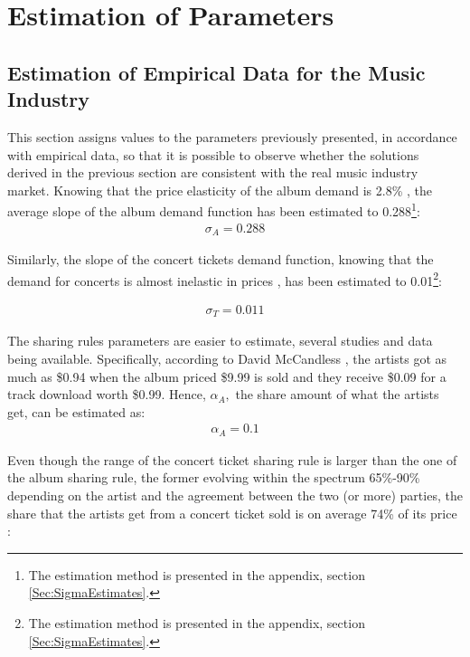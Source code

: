 \documentclass[a4paper,12pt]{article}
\numberwithin{equation}{section}
\begin{document}
\section{Estimation of Parameters} \label{Sec:Estimates}

\subsection{Estimation of Empirical Data for the Music Industry}

This section assigns values to the parameters previously presented,
in accordance with empirical data, so that it is possible to observe
whether the solutions derived in the previous section are consistent
with the real music industry market. Knowing that the price elasticity
of the album demand is 2.8\% \cite{gast2002}, the average slope of
the album demand function has been estimated to 0.288\footnote{
The estimation method is presented in the appendix, section \ref{Sec:SigmaEstimates}.
}:
\begin{eqnarray*}
\sigma_{A}=0.288
\end{eqnarray*}

Similarly, the slope of the concert tickets demand function, knowing
that the demand for concerts is almost inelastic in prices \cite{courty2009}, has been estimated to 0.01\footnote{
The estimation method is presented in the appendix, section \ref{Sec:SigmaEstimates}.
}:

\begin{eqnarray*}
\sigma_{T}=0.011
\end{eqnarray*}

The sharing rules parameters are easier to estimate, several studies
and data being available. Specifically, according to David McCandless \cite{mccandless2010}, the artists got as much as \$0.94 when the
album priced \$9.99 is sold and they receive \$0.09 for a track download
worth \$0.99. Hence, $\alpha_{A},$ the share amount of what the artists
get, can be estimated as:
\begin{eqnarray*}
\alpha_{A}=0.1
\end{eqnarray*}

Even though the range of the concert ticket sharing rule is larger
than the one of the album sharing rule, the former evolving within
the spectrum 65\%-90\% depending on the artist and the agreement between
the two (or more) parties, the share that the artists get from a concert
ticket sold is on average 74\% of its price \cite{michael2011}:
\end{document}
